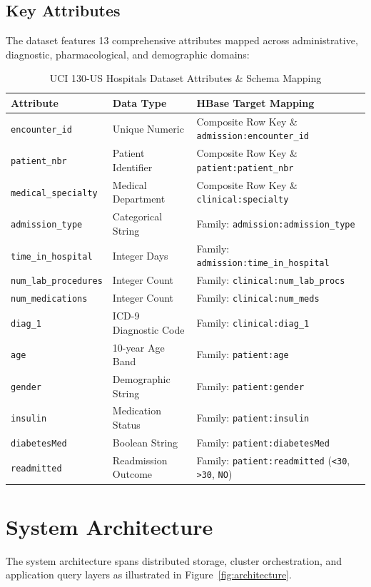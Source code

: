 \documentclass[12pt, a4paper]{article}
\begin{document}
\subsection{Key Attributes}
The dataset features 13 comprehensive attributes mapped across administrative, diagnostic, pharmacological, and demographic domains:
\begin{table}[H]
\centering
\caption{UCI 130-US Hospitals Dataset Attributes \& Schema Mapping}
\begin{tabular}{lll}
\toprule
\textbf{Attribute} & \textbf{Data Type} & \textbf{HBase Target Mapping} \\
\midrule
\texttt{encounter\_id} & Unique Numeric & Composite Row Key \& \texttt{admission:encounter\_id} \\
\texttt{patient\_nbr} & Patient Identifier & Composite Row Key \& \texttt{patient:patient\_nbr} \\
\texttt{medical\_specialty} & Medical Department & Composite Row Key \& \texttt{clinical:specialty} \\
\texttt{admission\_type} & Categorical String & Family: \texttt{admission:admission\_type} \\
\texttt{time\_in\_hospital} & Integer Days & Family: \texttt{admission:time\_in\_hospital} \\
\texttt{num\_lab\_procedures} & Integer Count & Family: \texttt{clinical:num\_lab\_procs} \\
\texttt{num\_medications} & Integer Count & Family: \texttt{clinical:num\_meds} \\
\texttt{diag\_1} & ICD-9 Diagnostic Code & Family: \texttt{clinical:diag\_1} \\
\texttt{age} & 10-year Age Band & Family: \texttt{patient:age} \\
\texttt{gender} & Demographic String & Family: \texttt{patient:gender} \\
\texttt{insulin} & Medication Status & Family: \texttt{patient:insulin} \\
\texttt{diabetesMed} & Boolean String & Family: \texttt{patient:diabetesMed} \\
\texttt{readmitted} & Readmission Outcome & Family: \texttt{patient:readmitted} (\texttt{<30}, \texttt{>30}, \texttt{NO}) \\
\bottomrule
\end{tabular}
\end{table}

\section{System Architecture}
The system architecture spans distributed storage, cluster orchestration, and application query layers as illustrated in Figure~\ref{fig:architecture}.
\end{document}
